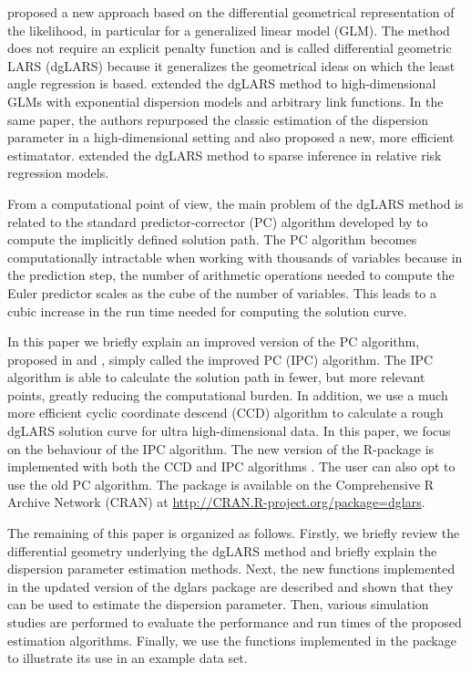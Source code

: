 \cite{Augug13} proposed a new approach based on the differential geometrical representation of the likelihood, in particular for a generalized linear model (GLM). The method does not require an explicit penalty function and is called differential geometric LARS (dgLARS) because it  generalizes the geometrical ideas on which the least angle regression \citep{efron04} is based.
\cite{pazira} extended the dgLARS method to high-dimensional GLMs with exponential dispersion models and arbitrary link functions. In the same paper, the authors repurposed the classic estimation of the dispersion parameter in a high-dimensional setting and also proposed a new, more efficient estimatator.  \cite{pazira_2} extended the dgLARS method to sparse inference in relative risk regression models.

From a computational point of view, the main problem of the dgLARS method is related to the standard predictor-corrector (PC) algorithm developed by \cite{Augug13} to compute the implicitly defined solution path. The PC algorithm  becomes computationally intractable when working with thousands of variables because in the prediction step, the number of arithmetic operations needed to compute the Euler predictor scales as the cube of the number of variables. 
This leads to a cubic increase in the run time needed for computing the solution curve.


In this paper we briefly explain an improved version of the PC algorithm, proposed in \cite{pazira} and \cite{pazira_3}, simply called the improved PC (IPC) algorithm. The IPC algorithm is able to calculate the solution path in fewer, but more relevant points, greatly reducing the computational burden.
In addition, we use a much more efficient cyclic coordinate descend (CCD) algorithm \citep{Augug12} to calculate a rough dgLARS solution curve for ultra high-dimensional data. In this paper, we focus on the behaviour of the IPC algorithm. The new version of the R-package  is implemented with both the CCD and IPC algorithms \citep{Augug14b}. The user can also opt to use the old PC algorithm. The package is available on the Comprehensive {R} Archive Network (CRAN) at \url{http://CRAN.R-project.org/package=dglars}.

The remaining of this paper is organized as follows. Firstly, we briefly review the differential geometry underlying the dgLARS method and briefly explain the dispersion parameter estimation methods. Next, the new functions implemented in the updated version of the {dglars} package are described and shown that they can be used to estimate the dispersion parameter. Then, various simulation studies are performed to evaluate the performance and run times of the proposed estimation algorithms. Finally, we use the functions implemented in the  package to illustrate its use in an example data set. 


